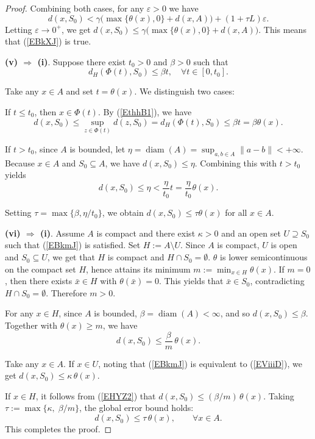 \documentclass[10pt,a4paper]{amsart}
\begin{document}
\begin{proof}
	Combining both cases, for any $\varepsilon>0$ we have
	\[
	d(x,S_0) < \gamma\bigl(\max\{\theta(x),0\}+d(x, A) \bigr) + (1+\tau L)\varepsilon.
	\]
	Letting $\varepsilon\to0^+$, we get
	$	d(x,S_0) \le \gamma\bigl(\max\{\theta(x),0\}+d(x, A) \bigr).	$
	This means that (\ref{EBkXJ}) is true.
	
	
	\noindent\textbf{(v) $\Rightarrow$ (i)}.
	Suppose there exist \(t_0 > 0\) and \(\beta > 0\) such that 
	\begin{equation}\label{EthhB1}
		d_H(\Phi(t), S_0) \le \beta t,  \quad  \forall t \in [0, t_0].
	\end{equation}
	
	
	Take any \(x \in A\) and set \(t = \theta(x)\). We distinguish two cases:
	
	If \(t \le t_0\), then \(x \in \Phi(t)\). By   (\ref{EthhB1}),  we have 
	\[
	d(x, S_0) \le \sup_{z \in \Phi(t)} d(z, S_0) = d_H(\Phi(t), S_0) \le \beta t = \beta \theta(x).
	\]
	
	If \(t > t_0\), since \(A\) is bounded, let \(\eta = \operatorname{diam}(A) = \sup_{a,b \in A} \|a - b\| < +\infty\). Because \(x \in A\) and \(S_0 \subseteq A\), we have \(d(x, S_0) \le \eta\). Combining this with \(t > t_0\) yields
	\[
	d(x, S_0) \le \eta < \frac{\eta}{t_0} t = \frac{\eta}{t_0} \theta(x).
	\]
	
	Setting \(\tau = \max\{\beta, \eta/t_0\}\), we obtain \(d(x, S_0) \le \tau \theta(x)\) for all \(x \in A\). 
	
	
	
	\noindent\textbf{(vi) $\Rightarrow$ (i)}.
	Assume $A$ is compact   and there exist $\kappa>0$ and an open set $U\supseteq S_0$ such that
	(\ref{EBkmJ})  is satisfied.   
	Set $H:=A\setminus U$.   Since   $A$ is compact, $U$ is open and $S_0 \subseteq U$,  we get that  $H$ is compact   and $H\cap S_0= \emptyset$.
	$\theta$ is lower semicontinuous   on the compact set $H$, hence attains its minimum $m:=\min_{x\in H}\theta(x)$.
	If $m=0$, then there exists $\bar x\in H$ with $\theta(\bar x)=0$. This yields   that   $\bar x\in S_0$, contradicting $H\cap S_0= \emptyset$. Therefore $m>0$.
	
	For any $x\in H$, since $A$ is bounded, $\beta =\operatorname{diam}(A)<\infty$, and so $d(x,S_0)\le \beta$. Together with $\theta(x)\ge m$, we have 
	\begin{equation} \label{EHYZ2}
		d(x,S_0)\le \frac{\beta}{m}\,\theta(x).  
	\end{equation}
	
	Take any $x\in A$.  If $x\in U$, noting that  (\ref{EBkmJ})  is  equivalent to (\ref{EViiiD}), we get  
	$d(x,S_0)\le\kappa\,\theta(x)$.
	
	If $x\in H$,  it follows from  (\ref{EHYZ2}) that $d(x,S_0)\le (\beta/m)\,\theta(x)$.
	Taking $\tau:=\max\{\kappa,\; \beta/m\}$, the global error bound holds:
	\[
	d(x,S_0)\le\tau\,\theta(x),\qquad \forall x\in A.
	\]
	This completes the proof. 
\end{proof}
\end{document}
